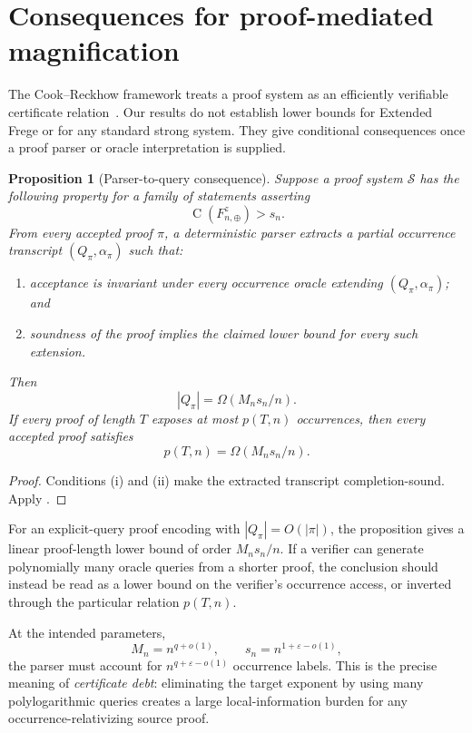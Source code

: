 \documentclass[11pt]{article}
\newtheorem{proposition}[theorem]{Proposition}
\theoremstyle{definition}
\newcommand{\Ckt}{\operatorname{C}}
\newcommand{\eps}{\varepsilon}
\begin{document}
\section{Consequences for proof-mediated magnification}\label{sec:proof-systems}

The Cook--Reckhow framework treats a proof system as an efficiently verifiable certificate relation~\cite{CR79}. Our results do not establish lower bounds for Extended Frege or for any standard strong system. They give conditional consequences once a proof parser or oracle interpretation is supplied.

\begin{proposition}[Parser-to-query consequence]\label{prop:parser}
Suppose a proof system $\mathcal{S}$ has the following property for a family of statements asserting
\[
  \Ckt(F_{n,\oplus}^z)>s_n.
\]
From every accepted proof $\pi$, a deterministic parser extracts a partial occurrence transcript $(Q_\pi,\alpha_\pi)$ such that:
\begin{enumerate}[label=(\roman*)]
  \item acceptance is invariant under every occurrence oracle extending $(Q_\pi,\alpha_\pi)$; and
  \item soundness of the proof implies the claimed lower bound for every such extension.
\end{enumerate}
Then
\[
  |Q_\pi|=\Omega(M_ns_n/n).
\]
If every proof of length $T$ exposes at most $p(T,n)$ occurrences, then every accepted proof satisfies
\[
  p(T,n)=\Omega(M_ns_n/n).
\]
\end{proposition}

\begin{proof}
Conditions (i) and (ii) make the extracted transcript completion-sound. Apply .
\end{proof}

For an explicit-query proof encoding with $|Q_\pi|=O(|\pi|)$, the proposition gives a linear proof-length lower bound of order $M_ns_n/n$. If a verifier can generate polynomially many oracle queries from a shorter proof, the conclusion should instead be read as a lower bound on the verifier's occurrence access, or inverted through the particular relation $p(T,n)$.

At the intended parameters,
\[
  M_n=n^{q+o(1)},
  \qquad
  s_n=n^{1+\eps-o(1)},
\]
the parser must account for $n^{q+\eps-o(1)}$ occurrence labels. This is the precise meaning of \emph{certificate debt}: eliminating the target exponent by using many polylogarithmic queries creates a large local-information burden for any occurrence-relativizing source proof.
\end{document}
